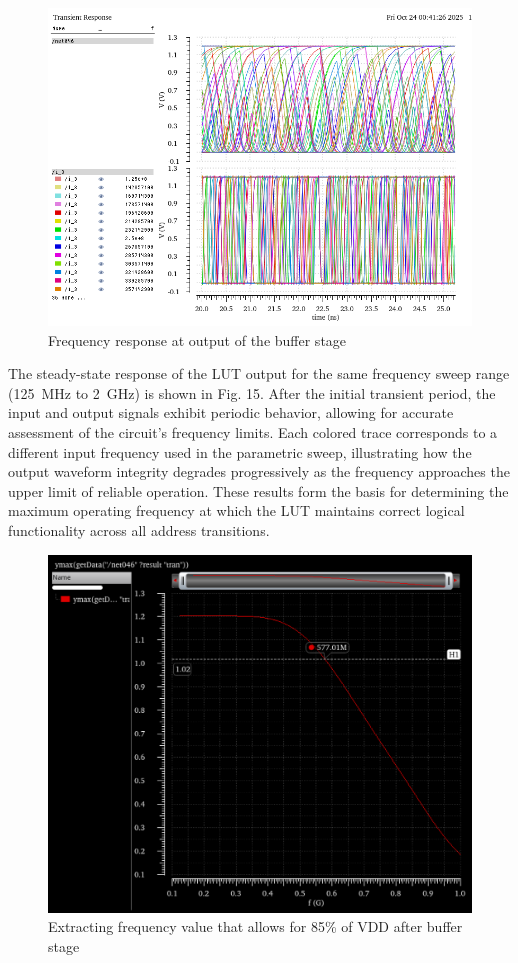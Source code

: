 \documentclass[12pt]{article}
\begin{document}
\begin{figure}[H]
    \centering
    \includegraphics[width=\linewidth]{writeup//figures/frequency_response_param_20_40.png}
    \caption{Frequency response at output of the buffer stage}
\end{figure}

The steady-state response of the LUT output for the same frequency sweep range (125~MHz to 2~GHz) is shown in Fig. 15. After the initial transient period, the input and output signals exhibit periodic behavior, allowing for accurate assessment of the circuit’s frequency limits. Each colored trace corresponds to a different input frequency used in the parametric sweep, illustrating how the output waveform integrity degrades progressively as the frequency approaches the upper limit of reliable operation. These results form the basis for determining the maximum operating frequency at which the LUT maintains correct logical functionality across all address transitions.

\begin{figure}[H]
    \centering
    \includegraphics[width=\linewidth]{writeup//figures/max_frequencies.png}
    \caption{Extracting frequency value that allows for 85\% of VDD after buffer stage}
\end{figure}
\end{document}
